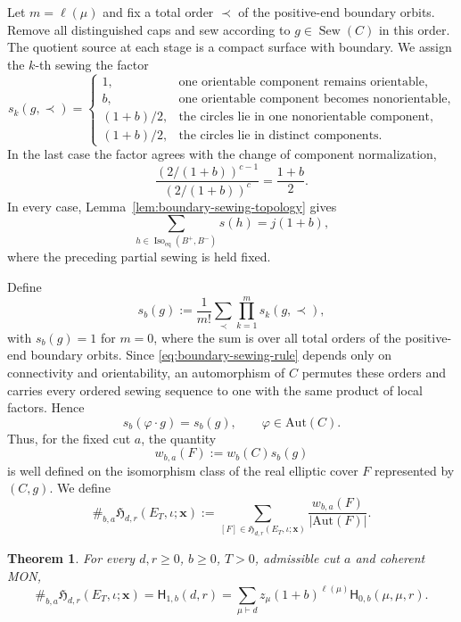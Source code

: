 \documentclass[11pt,a4paper,reqno]{article}
\newtheorem{theorem}{Theorem}[section]
\theoremstyle{definition}
\theoremstyle{remark}
\newcommand\Hb{{\mathsf H}}
\newcommand\ellpart{{\ell}}
\newcommand\Aut{{\mathrm{Aut}}}
\begin{document}
Let $m=\ellpart(\mu)$ and fix a total order $\prec$ of the positive-end boundary orbits.  Remove all distinguished caps and sew according to $g\in\operatorname{Sew}(C)$ in this order.  The quotient source at each stage is a compact surface with boundary.  We assign the $k$-th sewing the factor
\begin{equation}\label{eq:boundary-sewing-rule}
s_k(g,\prec)=
\begin{cases}
1,&\text{one orientable component remains orientable},\\
b,&\text{one orientable component becomes nonorientable},\\
(1+b)/2,&\text{the circles lie in one nonorientable component},\\
(1+b)/2,&\text{the circles lie in distinct components}.
\end{cases}
\end{equation}
In the last case the factor agrees with the change of component normalization,
\[
\frac{(2/(1+b))^{c-1}}{(2/(1+b))^c}=\frac{1+b}{2}.
\]
In every case, Lemma~\ref{lem:boundary-sewing-topology} gives
\begin{equation}\label{eq:one-boundary-sum}
\sum_{h\in\operatorname{Iso}_{\mathrm{eq}}(B^+,B^-)}s(h)=j(1+b),
\end{equation}
where the preceding partial sewing is held fixed.

Define
\begin{equation}\label{eq:order-averaged-sewing-weight}
s_b(g):=\frac1{m!}\sum_{\prec}\prod_{k=1}^m s_k(g,\prec),
\end{equation}
with $s_b(g)=1$ for $m=0$, where the sum is over all total orders of the positive-end boundary orbits.  Since \eqref{eq:boundary-sewing-rule} depends only on connectivity and orientability, an automorphism of $C$ permutes these orders and carries every ordered sewing sequence to one with the same product of local factors.  Hence
\[
s_b(\varphi\cdot g)=s_b(g), \qquad \varphi\in\Aut(C).
\]
Thus, for the fixed cut $a$, the quantity
\[
w_{b,a}(F):=w_b(C)s_b(g)
\]
is well defined on the isomorphism class of the real elliptic cover $F$ represented by $(C,g)$.  We define
\begin{equation}\label{eq:real-weighted-cardinality}
\#_{b,a}\mathfrak H_{d,r}(E_T,\iota;\mathbf x) :=\sum_{[F]\in\mathfrak H_{d,r}(E_T,\iota;\mathbf x)} \frac{w_{b,a}(F)}{|\Aut(F)|}.
\end{equation}
\begin{theorem}\label{thm:geometric-gluing}
For every $d,r\geq0$, $b\geq0$, $T>0$, admissible cut $a$ and coherent MON,
\begin{equation}\label{eq:geometric-diagonal-gluing}
\#_{b,a}\mathfrak H_{d,r}(E_T,\iota;\mathbf x) =\Hb_{1,b}(d,r) =\sum_{\mu\vdash d} z_\mu(1+b)^{\ellpart(\mu)} \Hb_{0,b}(\mu,\mu,r).
\end{equation}
\end{theorem}
\end{document}
